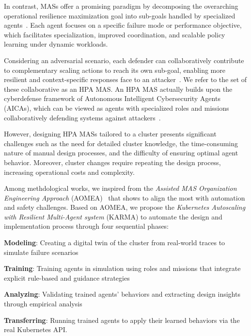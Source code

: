 In contrast, MASs offer a promising paradigm by decomposing the overarching operational resilience maximization goal into sub-goals handled by specialized agents~\cite{Shoham2009MAS}. Each agent focuses on a specific failure mode or performance objective, which facilitates specialization, improved coordination, and scalable policy learning under dynamic workloads.

Considering an adversarial scenario, each defender can collaboratively contribute to complementary scaling actions to reach its own sub-goal, enabling more resilient and context-specific responses face to an attacker~\cite{Jennings1998}. We refer to the set of these collaborative as an HPA MAS. An HPA MAS actually builds upon the cyberdefense framework of Autonomous Intelligent Cybersecurity Agents (AICAs), which can be viewed as agents with specialized roles and missions collaboratively defending systems against attackers~\cite{Kott2018}.

However, designing HPA MASs tailored to a cluster presents significant challenges such as the need for detailed cluster knowledge, the time-consuming nature of manual design processes, and the difficulty of ensuring optimal agent behavior. Moreover, cluster changes require repeating the design process, increasing operational costs and complexity.

Among methdological works, we inspired from the \textit{Assisted MAS Organization Engineering Approach} (AOMEA)~\cite{soule2024aomea} that shows to align the most with automation and safety challenges. Based on AOMEA, we propose the \textit{Kubernetes Autoscaling with Resilient Multi-Agent system} (KARMA) to automate the design and implementation process through four sequential phases:
\begin{enumerate*}[label=\textbf{\arabic*)}, itemjoin={;\quad }]
  \item \textbf{Modeling}: Creating a digital twin of the cluster from real-world traces to simulate failure scenarios
  \item \textbf{Training}: Training agents in simulation using roles and missions that integrate explicit rule-based and guidance strategies
  \item \textbf{Analyzing}: Validating trained agents' behaviors and extracting design insights through empirical analysis
  \item \textbf{Transferring}: Running trained agents to apply their learned behaviors via the real Kubernetes API.
\end{enumerate*}

